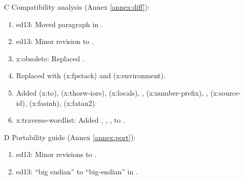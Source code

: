 \begin{itemize}
	\item[C] Compatibility analysis (Annex \ref{annex:diff}):	%
		\begin{enumerate}
		\item \textsf{ed13}: Moved paragraph in .
		\item \textsf{ed13}: Minor revision to .
		\item \textsf{x:obsolete}: Replaced .
		\item Replaced  with  (\textsf{x:fpstack})
			and  (\textsf{x:environment}).
		\item Added
					(\textsf{x:to}),
					(\textsf{x:thorw-iors}),
					(\textsf{x:locals}),
			,	(\textsf{x:number-prefix}),
			,	(\textsf{x:source-id}),
				(\textsf{x:fasinh}),
				(\textsf{x:fatan2}).
		\item \textsf{x:traverse-wordlist}: Added ,
			, , \linebreak
			 to .
	\end{enumerate}

	\item[D] Portability guide (Annex \ref{annex:port}):			%
		\begin{enumerate}
		\item \textsf{ed13}: Minor revisions to .
		\item \textsf{ed13}: ``big endian'' to ``big-endian'' in .
		\end{enumerate}
	\end{itemize}
\endinput

